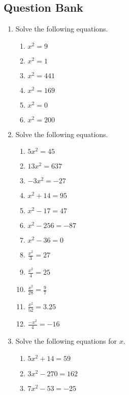 \documentclass[a4paper,12pt]{article}
\begin{document}
\newpage
\subsection*{Question Bank}

\begin{enumerate}
\item Solve the following equations.
    \begin{multicols}{2}
    \begin{enumerate}
    \item $x^2 = 9$
    \item $x^2 = 1$
    \item $x^2 = 441$
    \item $x^2 = 169$
    \item $x^2 = 0$
    \item $x^2 = 200$
    \end{enumerate}
    \end{multicols}
\item Solve the following equations.
    \begin{multicols}{2}
    \begin{enumerate}
    \item $5x^2 = 45$
    \item $13x^2 = 637$
    \item $-3x^2 = -27$
    \item $x^2 + 14 = 95$
    \item $x^2 - 17 = 47$
    \item $x^2 - 256 = -87$
    \item $x^2 - 36 = 0$
    \item $\displaystyle\frac{x^2}{3} = 27$
    \item $\displaystyle\frac{x^2}{4} = 25$
    \item $\displaystyle\frac{x^2}{28} = \frac{9}{7}$
    \item $\displaystyle\frac{x^2}{52} = 3.25$
    \item $\displaystyle\frac{-x^2}{4} = -16$
    \end{enumerate}
    \end{multicols}
\item Solve the following equations for $x$.
    \begin{multicols}{2}
    \begin{enumerate}
    \item $5x^2 + 14 = 59$
    \item $3x^2 - 270 = 162$
    \item $7x^2 - 53 = -25$

\end{enumerate}
\end{multicols}
\end{enumerate}
\end{document}
